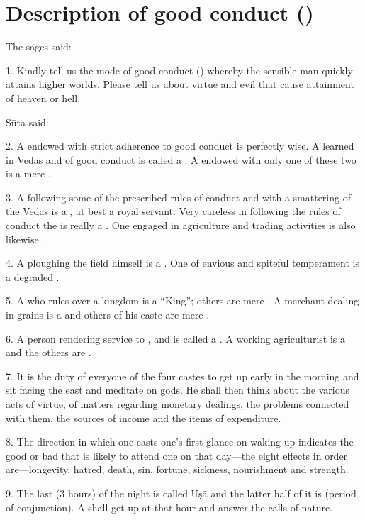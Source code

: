 \chapter{Description of good conduct ()}

The sages said:

1. Kindly tell us the mode of good conduct () whereby the sensible
man quickly attains higher worlds. Please tell us about virtue and evil that
cause attainment of heaven or hell.

Sūta said:

2. A  endowed with strict adherence to good conduct is perfectly
wise. A  learned in Vedas and of good conduct is called
a . A  endowed with only one of these two is a mere
.

3. A  following some of the prescribed rules of conduct and with
a smattering of the Vedas is a , at best a royal servant.
Very careless in following the rules of conduct the  is really
a . One engaged in agriculture and trading activities is
also likewise.

4. A  ploughing the field himself is a . One of
envious and spiteful temperament is a degraded .

5. A  who rules over a kingdom is a “King”; others are mere
. A merchant dealing in grains \etc is a  and others of
his caste are mere .

6. A person rendering service to ,  and 
is called a . A working agriculturist is a  and the others
are .

7. It is the duty of everyone of the four castes to get up early in the morning
and sit facing the east and meditate on gods. He shall then think about
the various acts of virtue, of matters regarding monetary dealings, the problems
connected with them, the sources of income and the items of expenditure.

8. The direction in which one casts one’s first glance on waking up indicates
the good or bad that is likely to attend one on that day—the eight effects in
order are—longevity, hatred, death, sin, fortune, sickness, nourishment and
strength.

9. The last  (3 hours) of the night is called Uṣā and the latter half
of it is  (period of conjunction). A  shall get up at
that hour and answer the calls of nature.

